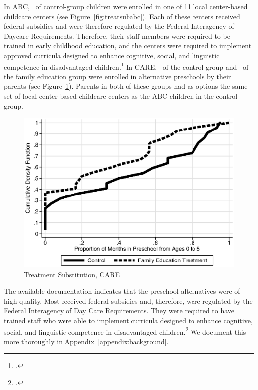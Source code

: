 \noindent In ABC, \treatsubsabc\ of control-group children were enrolled in one of 11 local center-based childcare centers (see Figure~\ref{fig:treatsubabc}). Each of these centers received federal subsidies and were therefore regulated by the Federal Interagency of Daycare Requirements. Therefore, their staff members were required to be trained in early childhood education, and the centers were required to implement approved curricula designed to enhance cognitive, social, and linguistic competence in disadvantaged children.\footnote{\citet{Burchinal_etal_1989_CD_Daycare-Pre-K-Dev}.} In CARE, \treatsubscarec\ of the control group and \treatsubscaref\ of the family education group were enrolled in alternative preschools by their parents (see Figure~\ref{fig:treatsubcare}). Parents in both of these groups had as options the same set of local center-based childcare centers as the ABC children in the control group.

\begin{figure}[H]
		\caption{Treatment Substitution, CARE} \label{fig:treatsubcare}
		\includegraphics[width=.9\columnwidth]{output/care_controlcontamination_months.eps}
\end{figure}

\noindent The available documentation indicates that the preschool alternatives were of high-quality. Most received federal subsidies and, therefore, were regulated by the Federal Interagency of Day Care Requirements. They were required to have trained staff who were able to implement curricula designed to enhance cognitive, social, and linguistic competence in disadvantaged children.\footnote{\citet{Burchinal_etal_1989_CD_Daycare-Pre-K-Dev}.} We document this more thoroughly in Appendix~\ref{appendix:background}.

